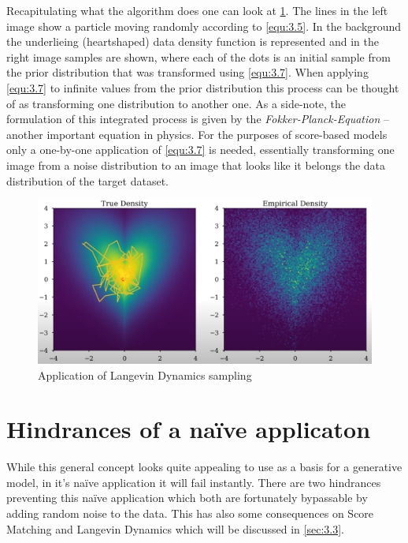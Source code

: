 Recapitulating what the algorithm does one can look at \cref{fig:3.1}. The lines in the left image show a particle moving randomly according to \cref{equ:3.5}. In the background the underlieing (heartshaped) data density function  is represented and in the right image samples are shown, where each of the dots is an initial sample from the prior distribution that was transformed using \cref{equ:3.7}. When applying \cref{equ:3.7} to infinite values from the prior distribution this process can be thought of as transforming one distribution to another one. As a side-note, the formulation of this integrated process is given by the \textit{Fokker-Planck-Equation} – another important equation in physics. For the purposes of score-based models only a one-by-one application of \cref{equ:3.7} is needed, essentially transforming one image from a noise distribution to an image that looks like it belongs the data distribution of the target dataset.
%
\begin{figure}[] \label{fig:3.1}
    \centering
    \includegraphics[width=.8\textwidth]{Chapters/figures/langevin.PNG}
    \caption[Short-form caption]{Application of Langevin Dynamics sampling}
\end{figure}
\section{Hindrances of a na\"{i}ve applicaton} \label{sec:3.2}
While this general concept looks quite appealing to use as a basis for a generative model, in it's na\"{i}ve application it will fail instantly. There are two hindrances preventing this na\"{i}ve application which both are fortunately bypassable by adding random noise to the data. This has also some consequences on Score Matching and Langevin Dynamics which will be discussed in \cref{sec:3.3}.
%
